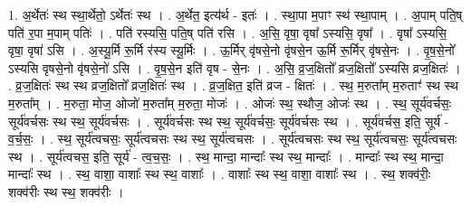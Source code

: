\documentclass[17pt]{extarticle}
\begin{document}
1. अ॒र्थेतः॑ स्थ स्था॒र्थेतो॒ ऽर्थेतः॑ स्थ । . अ॒र्थेत॒ इत्य॑र्थ - इतः॑ । . स्था॒पा म॒पाꣳ स्थ॑ स्था॒पाम् । . अ॒पाम् पति॒ष् पति॑ र॒पा म॒पाम् पतिः॑ । . पति॑ रस्यसि॒ पति॒ष् पति॑ रसि । . अ॒सि॒ वृषा॒ वृषा᳚ ऽस्यसि॒ वृषा᳚ । . वृषा᳚ ऽस्यसि॒ वृषा॒ वृषा॑ ऽसि । . अ॒स्यू॒र्मि रू॒र्मि र॑स्य स्यू॒र्मिः । . ऊ॒र्मिर् वृ॑षसे॒नो वृ॑षसे॒न ऊ॒र्मि रू॒र्मिर् वृ॑षसे॒नः । . वृ॒ष॒से॒नो᳚ ऽस्यसि वृषसे॒नो वृ॑षसे॒नो॑ ऽसि । . वृ॒ष॒से॒न इति॑ वृष - से॒नः । . अ॒सि॒ व्र॒ज॒क्षितो᳚ व्रज॒क्षितो᳚ ऽस्यसि व्रज॒क्षितः॑ । . व्र॒ज॒क्षितः॑ स्थ स्थ व्रज॒क्षितो᳚ व्रज॒क्षितः॑ स्थ । . व्र॒ज॒क्षित॒ इति॑ व्रज - क्षितः॑ । . स्थ॒ म॒रुता᳚म् म॒रुताꣳ॑ स्थ स्थ म॒रुता᳚म् । . म॒रुता॒ मोज॒ ओजो॑ म॒रुता᳚म् म॒रुता॒ मोजः॑ । . ओजः॑ स्थ॒ स्थौज॒ ओजः॑ स्थ । . स्थ॒ सूर्य॑वर्चसः॒ सूर्य॑वर्चसः स्थ स्थ॒ सूर्य॑वर्चसः । . सूर्य॑वर्चसः स्थ स्थ॒ सूर्य॑वर्चसः॒ सूर्य॑वर्चसः स्थ । . सूर्य॑वर्चस॒ इति॒ सूर्य॑ - व॒र्च॒सः॒ । . स्थ॒ सूर्य॑त्वचसः॒ सूर्य॑त्वचसः स्थ स्थ॒ सूर्य॑त्वचसः । . सूर्य॑त्वचसः स्थ स्थ॒ सूर्य॑त्वचसः॒ सूर्य॑त्वचसः स्थ । . सूर्य॑त्वचस॒ इति॒ सूर्य॑ - त्व॒च॒सः॒ । . स्थ॒ मान्दा॒ मान्दाः᳚ स्थ स्थ॒ मान्दाः᳚ । . मान्दाः᳚ स्थ स्थ॒ मान्दा॒ मान्दाः᳚ स्थ । . स्थ॒ वाशा॒ वाशाः᳚ स्थ स्थ॒ वाशाः᳚ । . वाशाः᳚ स्थ स्थ॒ वाशा॒ वाशाः᳚ स्थ । . स्थ॒ शक्व॑रीः॒ शक्व॑रीः स्थ स्थ॒ शक्व॑रीः । \newline
\end{document}
